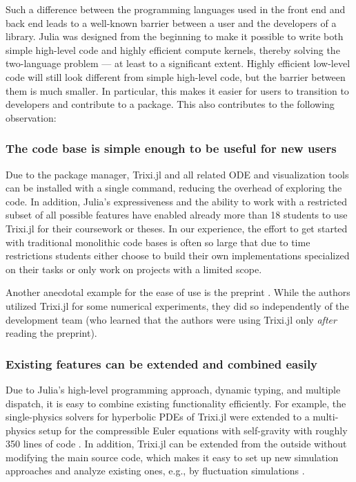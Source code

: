 \documentclass[hidelinks]{juliacon} %
\makeatletter
\newcommand{\eg}[0]{{e.g.\@}\xspace}
\newcommand{\trixi}{Trixi.jl\xspace}
\makeatother
\begin{document}
Such a difference between the programming languages used in the front end and
back end leads to a well-known barrier between a user and the developers of a library.
Julia was designed from the beginning to make it possible to write both simple
high-level code and highly efficient compute kernels, thereby solving the
two-language problem --- at least to a significant extent. Highly efficient low-level
code will still look different from simple high-level code, but the
barrier between them is much smaller. In particular, this makes it easier for
users to transition to developers and contribute to a package. This also contributes
to the following observation:

\subsubsection{The code base is simple enough to be useful for new users}

Due to the package manager, \trixi and all related ODE and visualization tools
can be installed with a single command, reducing the overhead of exploring the
code. In addition, Julia's expressiveness and the ability to work with a restricted
subset of all possible features have enabled already more than 18 students to use \trixi
for their coursework or theses. In our experience, the effort to get
started with traditional monolithic code bases is often so large that due to time restrictions
students either choose to build their own implementations specialized on their tasks or only work on
projects with a limited scope.

Another anecdotal example for the ease of use is the preprint \cite{singh2021linear}.
While the authors utilized \trixi for some numerical experiments, they did so
independently of the development team (who learned that the authors were
using \trixi only \textit{after} reading the preprint).

\subsubsection{Existing features can be extended and combined easily}

Due to Julia's high-level programming approach, dynamic typing, and multiple
dispatch, it is easy to combine existing functionality efficiently. For example,
the single-physics solvers for hyperbolic PDEs of \trixi were extended to
a multi-physics setup for the compressible Euler equations with self-gravity
with roughly 350 lines of code \cite{schlottkelakemper2021purely}.
In addition, \trixi can be extended from the outside without modifying the main
source code, which makes it easy to set up new simulation approaches and analyze
existing ones, \eg, by fluctuation simulations \cite{ranocha2021preventing}.
\end{document}
